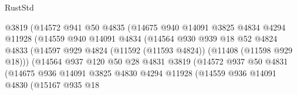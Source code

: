 \begin{lexlean}{RustStd}
\begin{coremodule}
                                  @3819
                                  (@14572
                                    @941
                                    @50
                                    @4835
                                    (@14675
                                      @940
                                      @14091
                                      @3825
                                      @4834
                                      @4294
                                      @11928
                                      (@14559
                                        @940
                                        @14091
                                        @4834
                                        (@14564
                                          @930
                                          @939
                                          @18
                                          @52
                                          @4824
                                          @4833
                                          (@14597
                                            @929
                                            @4824
                                            (@11592 (@11593 @4824))
                                            (@11408 (@11598 @929 @18)))
                                          (@14564
                                            @937
                                            @120
                                            @50
                                            @28
                                            @4831
                                            @3819
                                            (@14572
                                              @937
                                              @50
                                              @4831
                                              (@14675
                                                @936
                                                @14091
                                                @3825
                                                @4830
                                                @4294
                                                @11928
                                                (@14559
                                                  @936
                                                  @14091
                                                  @4830
                                                  (@15167
                                                    @935
                                                    @18

\end{coremodule}
\end{lexlean}

